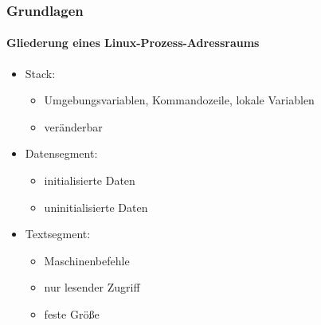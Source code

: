 \documentclass[ddcfooter,nosectionnum]{tudbeamer}
\begin{document}
\begin{frame}
	\frametitle{Grundlagen}
    \framesubtitle {Gliederung eines Linux-Prozess-Adressraums}
	
	\begin{minipage}[b]{0.7\textwidth}
			\begin{itemize}
		 		\item Stack:  
				\begin{itemize}
					\item Umgebungsvariablen, Kommandozeile, lokale Variablen
					\item veränderbar
				\end{itemize}  	
				\item Datensegment:  
				\begin{itemize}
					\item initialisierte Daten    
					\item uninitialisierte Daten
				\end{itemize}
				\item Textsegment: 
				\begin{itemize}
					\item Maschinenbefehle
					\item nur lesender Zugriff
					\item feste Größe 
				\end{itemize}
    		\end{itemize}
\end{minipage}
%
\begin{minipage}[b] {0.29\textwidth}

\end{minipage}
\end{frame}
\end{document}
